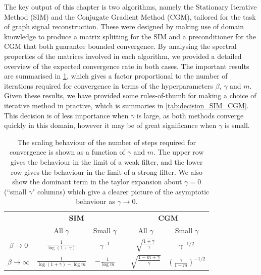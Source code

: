 The key output of this chapter is two algorithms, namely the Stationary Iterative Method (SIM) and the Conjugate Gradient Method (CGM), tailored for the task of graph signal reconstruction. These were designed by making use of domain knowledge to produce a matrix splitting for the SIM and a preconditioner for the CGM that both guarantee bounded convergence. By analysing the spectral properties of the matrices involved in each algorithm, we provided a detailed overview of the expected convergence rate in both cases. The important results are summarised in \cref{tab:conv_SIM_CGM}, which gives a factor proportional to the number of iterations required for convergence in terms of the hyperparameters $\beta$, $\gamma$ and $m$. Given these results, we have provided some rules-of-thumb for making a choice of iterative method in practive, which is summaries in \cref{tab:decision_SIM_CGM}. This decision is of less importance when $\gamma$ is large, as both methods converge quickly in this domain, however it may be of great significance when $\gamma$ is small. 


\begin{table}[h]
    \centering
    \def\arraystretch{1.5}
    \begin{tabular}{@{}cccccc}
    \toprule
    & \multicolumn{2}{c}{\textbf{SIM}} & \phantom{abc}& \multicolumn{2}{c}{\textbf{CGM}} \\
    \cmidrule{2-3} \cmidrule{5-6}
                               & All $\gamma$   & Small $\gamma$   &&  All $\gamma$   & Small $\gamma$ \\ \midrule \rule{0pt}{1cm}
    $\beta \rightarrow 0$      & $ \displaystyle \frac{1}{\log(1 + \gamma)}$   & $\displaystyle \gamma^{-1}$    &&    $\displaystyle \sqrt{\frac{1 + \gamma}{\gamma}}$ & $\displaystyle \gamma^{-1/2}$    \\ \rule{0pt}{6ex}
    $\beta \rightarrow \infty$ & $\displaystyle \frac{1}{\log(1 + \gamma) - \log m}$ & $\displaystyle -\frac{1}{\log m}$    &&  $\displaystyle \sqrt{\frac{1 - m + \gamma}{\gamma}}$ & $\displaystyle \left(\frac{\gamma}{1 - m} \right)^{-1/2}$ \\[0.5cm] \bottomrule 
    \end{tabular}
    \caption{The scaling behaviour of the number of steps required for convergence is shown as a function of $\gamma$ and $m$. The upper row gives the behaviour in the limit of a weak filter, and the lower row gives the behaviour in the limit of a strong filter. We also show the dominant term in the taylor expansion about $\gamma=0$ (``small $\gamma$" columns) which give a clearer picture of the asymptotic behaviour as $\gamma \rightarrow 0$. }
    \label{tab:conv_SIM_CGM} 
\end{table}



